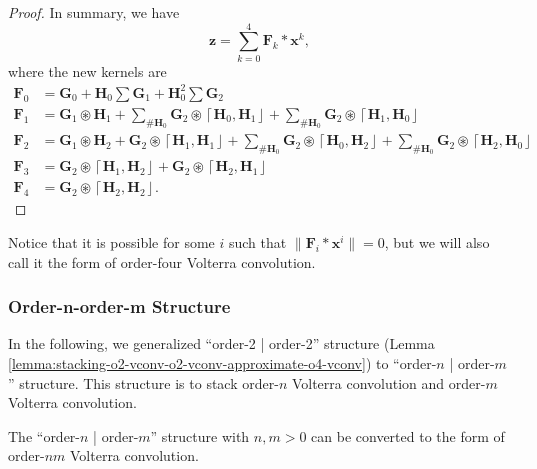 \documentclass[twoside,11pt]{article}
\def\oconv{\circledast}
\def\dsmark{{\scriptstyle \#}}
\def\tvar#1{\mathbf{#1}} %
\def\lcerfl#1{\left\lceil{#1}\right\rfloor}
\begin{document}
\begin{proof}
  In summary, we have
  \begin{equation*}
    \tvar{z} = \sum_{k=0}^{4} \tvar{F}_k * \tvar{x}^k,
  \end{equation*}
  where the new kernels are
  \begin{equation}
    \label{equ:combination-two-volterra-kernels}
    \begin{aligned}
      \tvar{F}_0 & = \tvar{G}_0 + \tvar{H}_0 \sum \tvar{G}_1 + \tvar{H}_0^2 \sum \tvar{G}_2 \\
      \tvar{F}_1 & = \tvar{G}_1 \oconv \tvar{H}_1
      + \sum_{\dsmark \tvar{H}_0} \tvar{G}_2 \oconv \lcerfl{\tvar{H}_0, \tvar{H}_1}
      + \sum_{\dsmark \tvar{H}_0} \tvar{G}_2 \oconv \lcerfl{\tvar{H}_1, \tvar{H}_0}         \\
      \tvar{F}_2 & = \tvar{G}_1 \oconv \tvar{H}_2
      + \tvar{G}_2 \oconv \lcerfl{\tvar{H}_1, \tvar{H}_1}
      + \sum_{\dsmark \tvar{H}_0} \tvar{G}_2 \oconv \lcerfl{\tvar{H}_0, \tvar{H}_2}
      + \sum_{\dsmark \tvar{H}_0} \tvar{G}_2 \oconv \lcerfl{\tvar{H}_2, \tvar{H}_0}         \\
      \tvar{F}_3 & = \tvar{G}_2 \oconv \lcerfl{\tvar{H}_1, \tvar{H}_2}
      + \tvar{G}_2 \oconv \lcerfl{\tvar{H}_2, \tvar{H}_1}                                   \\
      \tvar{F}_4 & = \tvar{G}_2 \oconv \lcerfl{\tvar{H}_2, \tvar{H}_2}.
    \end{aligned}
  \end{equation}
\end{proof}

Notice that it is possible for some \(i\) such that \(\|\tvar{F}_i * \tvar{x}^i \| = 0\), but we will also call it the form of order-four Volterra convolution.


\subsubsection{Order-n-order-m Structure}
\label{subsubsec:transform-on-om-vconv}

In the following, we generalized ``order-2 | order-2'' structure (Lemma \ref{lemma:stacking-o2-vconv-o2-vconv-approximate-o4-vconv}) to ``order-\(n\) | order-\(m\)'' structure. This structure is to stack order-\(n\) Volterra convolution and order-\(m\) Volterra convolution.

\begin{lemma}
  The ``order-\(n\) | order-\(m\)'' structure with \(n,m > 0\) can be converted to the form of order-\(nm\) Volterra convolution.
  \label{lemma:stacking-on-vconv-om-vconv-approximate-onm-vconv}
\end{lemma}
\end{document}
